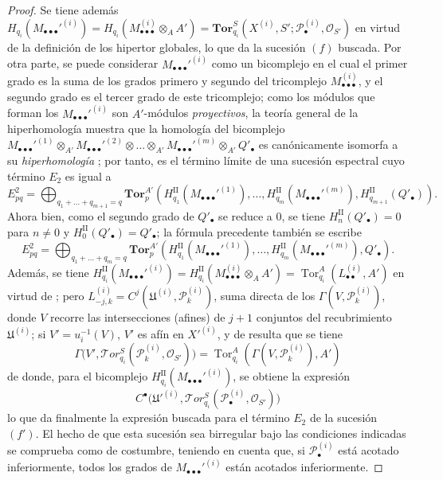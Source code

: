 \documentclass[10pt,oneside,openany]{book}
\theoremstyle{egaenv}\newtheorem*{env}{---}
\theoremstyle{egastatement}
\theoremstyle{egadescription}
\newcommand{\oldpage}[2][]{\marginnote{\normalfont\scriptsize\textbf{#1}\,|\,#2}\ignorespaces}
\begin{document}
\begin{proof}
\oldpage[III]{168}
Se tiene además
$H_{q_i}(M_{\bullet\bullet\bullet}'^{(i)})
=H_{q_i}(M_{\bullet\bullet\bullet}^{(i)}\otimes_A A')
=\mathbf{Tor}_{q_i}^S
(X^{(i)},S';\mathscr P_\bullet^{(i)},\mathscr O_{S'})$
en virtud de la definición de los hipertor globales, lo que da la sucesión
$(f)$ buscada. Por otra parte, se puede considerar
$M_{\bullet\bullet\bullet}'^{(i)}$ como un bicomplejo en el cual el primer
grado es la suma de los grados primero y segundo del tricomplejo
$M_{\bullet\bullet\bullet}^{(i)}$, y el segundo grado es el tercer grado de
este tricomplejo; como los módulos que forman los
$M_{\bullet\bullet\bullet}'^{(i)}$ son $A'$-módulos \emph{proyectivos}, la teoría
general de la hiperhomología muestra que la homología del bicomplejo
$M_{\bullet\bullet\bullet}'^{(1)}\otimes_{A'}
M_{\bullet\bullet\bullet}'^{(2)}\otimes\ldots\otimes_{A'}
M_{\bullet\bullet\bullet}'^{(m)}\otimes_{A'} Q'_\bullet$
es canónicamente isomorfa a su \emph{hiperhomología} ; por tanto,
es el término límite de una sucesión espectral cuyo término $E_2$ es igual a
\[
  E_{pq}^2
  =\bigoplus_{q_1+\ldots+q_{m+1}=q}
  \mathbf{Tor}_p^{A'}
  (H_{q_1}^{\mathrm{II}}(M_{\bullet\bullet\bullet}'^{(1)}),\ldots,
   H_{q_m}^{\mathrm{II}}(M_{\bullet\bullet\bullet}'^{(m)}),
   H_{q_{m+1}}^{\mathrm{II}}(Q'_\bullet)).
\]
Ahora bien, como el segundo grado de $Q'_\bullet$ se reduce a $0$, se tiene
$H_n^{\mathrm{II}}(Q'_\bullet)=0$ para $n\ne0$ y
$H_0^{\mathrm{II}}(Q'_\bullet)=Q'_\bullet$; la fórmula precedente también
se escribe
\[
  E_{pq}^2
  =\bigoplus_{q_1+\ldots+q_m=q}
  \mathbf{Tor}_p^{A'}
  (H_{q_1}^{\mathrm{II}}(M_{\bullet\bullet\bullet}'^{(1)}),\ldots,
   H_{q_m}^{\mathrm{II}}(M_{\bullet\bullet\bullet}'^{(m)}),Q'_\bullet).
\]
Además, se tiene
$H_{q_i}^{\mathrm{II}}(M_{\bullet\bullet\bullet}'^{(i)})
=H_{q_i}^{\mathrm{II}}(M_{\bullet\bullet\bullet}^{(i)}\otimes_A A')
=\operatorname{Tor}_{q_i}^A(L_{\bullet\bullet}^{(i)},A')$
en virtud de ; pero
$L_{-j,k}^{(i)}=C^j(\mathfrak U^{(i)},\mathscr P_k^{(i)})$, suma directa de
los $\Gamma(V,\mathscr P_k^{(i)})$, donde $V$ recorre las intersecciones
(afines) de $j+1$ conjuntos del recubrimiento $\mathfrak U^{(i)}$; si
$V'=u_i^{-1}(V)$, $V'$ es afín en $X'^{(i)}$, y de
 resulta que se tiene
\[
  \Gamma\bigl(V',\mathscr{T}\!or_{q_i}^S
  (\mathscr P_k^{(i)},\mathscr O_{S'})\bigr)
  =\operatorname{Tor}_{q_i}^A(\Gamma(V,\mathscr P_k^{(i)}),A')
\]
de donde, para el bicomplejo
$H_{q_i}^{\mathrm{II}}(M_{\bullet\bullet\bullet}'^{(i)})$, se obtiene la
expresión
\[
  C^\bullet\bigl(\mathfrak U'^{(i)},
  \mathscr{T}\!or_{q_i}^S(\mathscr P_\bullet^{(i)},\mathscr O_{S'})\bigr)
\]
lo que da finalmente la expresión buscada para el término $E_2$ de la
sucesión $(f')$. El hecho de que esta sucesión sea birregular bajo las
condiciones indicadas se comprueba como de costumbre, teniendo en cuenta que,
si $\mathscr P_\bullet^{(i)}$ está acotado inferiormente, todos los grados de
$M_{\bullet\bullet\bullet}'^{(i)}$ están acotados inferiormente.
\end{proof}
\end{document}
